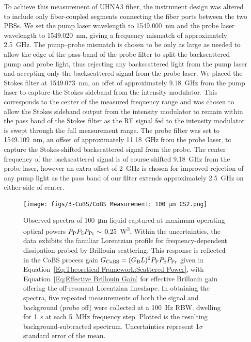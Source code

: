 To achieve this measurement of \ac{UHNA3} fiber, the instrument design was altered to include only fiber-coupled segments connecting the fiber ports between the two \ac{PBS}s. We set the pump laser wavelength to \SI{1549.000}{\nano\meter} and the probe laser wavelength to \SI{1549.020}{\nano\meter}, giving a frequency mismatch of approximately \SI{2.5}{\giga\hertz}. The pump--probe mismatch is chosen to be only as large as needed to allow the edge of the pass-band of the probe filter to split the backscattered pump and probe light, thus rejecting any backscattered light from the pump laser and accepting only the backscattered signal from the probe laser. We placed the Stokes filter at \SI{1549.073}{\nano\meter}, an offet of approximately \SI{9.18}{\giga\hertz} from the pump laser to capture the Stokes sideband from the intensity modulator. This corresponds to the center of the measured frequency range and was chosen to allow the Stokes sideband output from the intensity modulator to remain within the pass band of the Stokes filter as the RF signal fed to the intensity modulator is swept through the full measurement range. The probe filter was set to \SI{1549.109}{\nano\meter}, an offset of approximately \SI{11.18}{\giga\hertz} from the probe laser, to capture the Stokes-shifted backscattered signal from the probe. The center frequency of the backscattered signal is of course shifted \SI{9.18}{\giga\hertz} from the probe laser, however an extra offset of \SI{2}{\giga\hertz} is chosen for improved rejection of any pump light as the pass band of our filter extends approximately \SI{2.5}{\giga\hertz} on either side of center.

\begin{figure}[t!]
  \centering
  \hspace{-2em}\texttt{[image: figs/3-CoBS/CoBS Measurement: 100 μm CS2.png]}
  \caption{Observed spectra of \SI{100}{\micro\meter} liquid  captured at maximum operating optical powers \(P_{\rm P}P_{\rm S}P_{\rm Pr} \sim\) \SI{0.25}{\cubic\watt}. Within the uncertainties, the data exhibits the familiar Lorentzian profile for frequency-dependent dissipation probed by Brillouin scattering. This response is reflected in the \ac{CoBS} process gain \(G_{\rm CoBS} = (G_{\rm B}L)^{2}P_{\rm P}P_{\rm S}P_{\rm Pr}\) given in Equation~\ref{Eq:Theoretical Framework:Scattered Power}, with Equation~\ref{Eq:Effective Brillouin Gain} for effective Brillouin gain offering the off-resonant Lorentzian lineshape. In obtaining the spectra, five repeated measurements of both the signal and background (probe off) were collected at a \SI{100}{\hertz} \ac{RBW}, dwelling for \SI{1}{\second} at each \SI{5}{\mega\hertz} frequency step. Plotted is the resulting background-subtracted spectrum. Uncertainties represent 1\(\sigma\) standard error of the mean.}
  \label{fig:100umCS2}
\end{figure}

